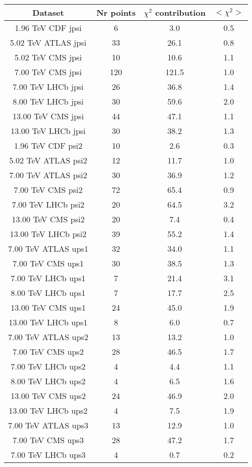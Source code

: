 \begin{table}[h!]
\centering
\begin{tabular}{c|c|c|c}
Dataset & Nr points & $\chi^2$ contribution & $<\chi^2>$ \\
\hline
1.96 TeV CDF jpsi & 6 & 3.0 & 0.5 \\
5.02 TeV ATLAS jpsi & 33 & 26.1 & 0.8 \\
5.02 TeV CMS jpsi & 10 & 10.6 & 1.1 \\
7.00 TeV CMS jpsi & 120 & 121.5 & 1.0 \\
7.00 TeV LHCb jpsi & 26 & 36.8 & 1.4 \\
8.00 TeV LHCb jpsi & 30 & 59.6 & 2.0 \\
13.00 TeV CMS jpsi & 44 & 47.1 & 1.1 \\
13.00 TeV LHCb jpsi & 30 & 38.2 & 1.3 \\
1.96 TeV CDF psi2 & 10 & 2.6 & 0.3 \\
5.02 TeV ATLAS psi2 & 12 & 11.7 & 1.0 \\
7.00 TeV ATLAS psi2 & 30 & 36.9 & 1.2 \\
7.00 TeV CMS psi2 & 72 & 65.4 & 0.9 \\
7.00 TeV LHCb psi2 & 20 & 64.5 & 3.2 \\
13.00 TeV CMS psi2 & 20 & 7.4 & 0.4 \\
13.00 TeV LHCb psi2 & 39 & 55.2 & 1.4 \\
7.00 TeV ATLAS ups1 & 32 & 34.0 & 1.1 \\
7.00 TeV CMS ups1 & 30 & 38.5 & 1.3 \\
7.00 TeV LHCb ups1 & 7 & 21.4 & 3.1 \\
8.00 TeV LHCb ups1 & 7 & 17.7 & 2.5 \\
13.00 TeV CMS ups1 & 24 & 45.0 & 1.9 \\
13.00 TeV LHCb ups1 & 8 & 6.0 & 0.7 \\
7.00 TeV ATLAS ups2 & 13 & 13.2 & 1.0 \\
7.00 TeV CMS ups2 & 28 & 46.5 & 1.7 \\
7.00 TeV LHCb ups2 & 4 & 4.4 & 1.1 \\
8.00 TeV LHCb ups2 & 4 & 6.5 & 1.6 \\
13.00 TeV CMS ups2 & 24 & 46.9 & 2.0 \\
13.00 TeV LHCb ups2 & 4 & 7.5 & 1.9 \\
7.00 TeV ATLAS ups3 & 13 & 12.9 & 1.0 \\
7.00 TeV CMS ups3 & 28 & 47.2 & 1.7 \\
7.00 TeV LHCb ups3 & 4 & 0.7 & 0.2 \\

\end{tabular}
\end{table}
